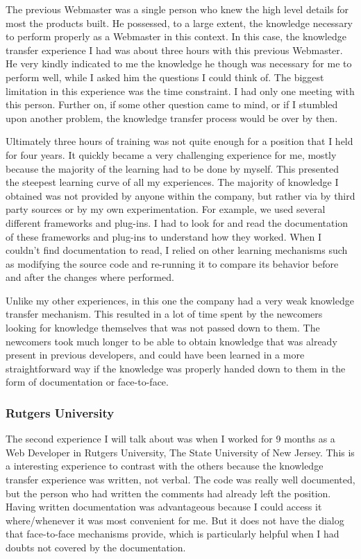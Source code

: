 \documentclass[12pt, letterpaper]{article}
\begin{document}
The previous Webmaster was a single person who knew the high level details for most the products built. He possessed, 
to a large extent, the knowledge necessary to perform properly as a Webmaster in this context.
In this case, the knowledge transfer experience I had was about three hours with this previous Webmaster. He very kindly
indicated to me the knowledge he though was necessary for me to perform well, while I asked him the questions I could 
think of. The biggest limitation in this experience was the time constraint. I had only one meeting with 
this person. Further on, if some other question came to mind, or if I stumbled upon another problem, the knowledge
transfer process would be over by then.

Ultimately three hours of training was not quite enough for a position that I held for four
years. It quickly became a very challenging experience for me, mostly because the majority of the learning had to be done 
by myself. This presented the steepest learning curve of all my experiences. The 
majority of knowledge I obtained was not provided by anyone within the company, but rather via by third party
sources or by my own experimentation. For example, we used several different frameworks and plug-ins. 
I had to look for and read the documentation of 
these frameworks and plug-ins to understand how they worked. When I couldn't find documentation to read, I relied
on other learning mechanisms such as modifying the source code and re-running it to compare its behavior
before and after the changes where performed. 

Unlike my other experiences, in this one the company had a very weak knowledge transfer mechanism.
This resulted in a lot of time spent by the newcomers looking for knowledge themselves that was not passed down to them. 
The newcomers took much longer to be able to obtain knowledge that was already present in previous developers,
and could have been learned in a more straightforward way if the knowledge was properly handed down to them 
in the form of documentation or face-to-face.

\subsubsection{Rutgers University}
The second experience I will talk about was when I worked for 9 months as a Web Developer in Rutgers University, The
State University of New Jersey. This is a interesting experience to contrast with the others because the knowledge 
transfer experience was written, not verbal. The code was really well documented, but the person who had 
written the comments had already left the position. Having written documentation was advantageous because 
I could access it where/whenever it was most convenient for me. But it does not have the dialog that face-to-face
mechanisms provide, which is particularly helpful when I had doubts not covered by the documentation. 
\end{document}
